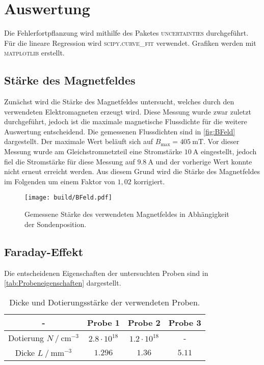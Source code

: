\section{Auswertung}
\label{sec:auswertung}

Die Fehlerfortpflanzung wird mithilfe des Paketes \textsc{uncertainties} \cite{uncertainties} durchgeführt.
Für die lineare Regression wird \textsc{scipy.curve\_fit} \cite{scipy} verwendet.
Grafiken werden mit \textsc{matplotlib} \cite{matplotlib} erstellt.

\subsection{Stärke des Magnetfeldes}

Zunächst wird die Stärke des Magnetfeldes untersucht, welches durch den verwendeten Elektromagneten erzeugt wird.
Diese Messung wurde zwar zuletzt durchgeführt, jedoch ist die maximale magnetische Flussdichte für die weitere Auswertung entscheidend.
Die gemessenen Flussdichten sind in \autoref{fig:BFeld} dargestellt.
Der maximale Wert beläuft sich auf $B_{\text{max}} = \SI{405}{\milli\tesla}$. 
Vor dieser Messung wurde am Gleichstromnetzteil eine Stromstärke $\SI{10}{\ampere}$ eingestellt, jedoch fiel die Stromstärke für diese Messung auf $\SI{9.8}{\ampere}$
und der vorherige Wert konnte nicht erneut erreicht werden.
Aus diesem Grund wird die Stärke des Magnetfeldes im Folgenden um einem Faktor von $1,02$ korrigiert.

\begin{figure}[H]
    \centering
    \texttt{[image: build/BFeld.pdf]}
    \caption{Gemessene Stärke des verwendeten Magnetfeldes in Abhängigkeit der Sondenposition.}
    \label{fig:BFeld}
\end{figure}

\subsection{Faraday-Effekt}

Die entscheidenen Eigenschaften der untersuchten Proben sind in \autoref{tab:Probeneigenschaften} dargestellt.

\begin{table}[H]
    \centering
    \caption{Dicke und Dotierungsstärke der verwendeten Proben.}
    \label{tab:Probeneigenschaften}
    \begin{tabular}{c c c c}
    \toprule
      {-} & {Probe 1} & {Probe 2} & {Probe 3} \\
    \midrule
          {Dotierung $N \mathbin{/} \unit{\centi\meter^{-3}}$}  &  $2.8 \cdot 10^{18}$ & $1.2 \cdot 10^{18}$ &   {-}    \\    
          {Dicke     $L \mathbin{/} \unit{\milli\meter^{-3}}$}  &  $1.296$             & $1.36$              &   $ 5.11$\\    
    \bottomrule
    \end{tabular}
\end{table}

